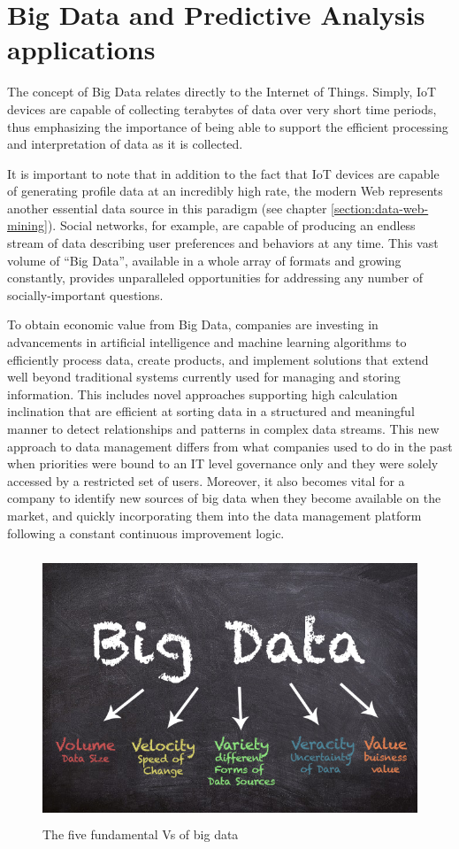 \section{Big Data and Predictive Analysis applications}

The concept of Big Data relates directly to the Internet of Things. Simply, IoT devices are capable of collecting terabytes of data over very short time periods, thus emphasizing the importance of being able to support the efficient processing and interpretation of data as it is collected.


It is important to note that in addition to the fact that IoT devices are capable of generating profile data at an incredibly high rate, the modern Web represents another essential data source in this paradigm (see chapter \ref{section:data-web-mining}). Social networks, for example, are capable of producing an endless stream of data describing user preferences and behaviors at any time. This vast volume of “Big Data”, available in a whole array of formats and growing constantly, provides unparalleled opportunities for addressing any number of socially-important questions.

To obtain economic value from Big Data, companies are investing in advancements in artificial intelligence and machine learning algorithms to efficiently process data, create products, and implement solutions that extend well beyond traditional systems currently used for managing and storing information. This includes novel approaches supporting high calculation inclination that are efficient at sorting data in a structured and meaningful manner to detect relationships and patterns in complex data streams. This new approach to data management differs from what companies used to do in the past when priorities were bound to an IT level governance only and they were solely accessed by a restricted set of users. Moreover, it also becomes vital for a company to identify new sources of big data when they become available on the market, and quickly incorporating them into the data management platform following a constant continuous improvement logic.

\vspace{0.5cm}
\begin{figure}[htbp]
  \centering
    \includegraphics[height=8cm]{images/bigdata.png}
  \caption{The five fundamental Vs of big data }
  \label{fig:bigdata}
\end{figure}
\vspace{0.5cm}


